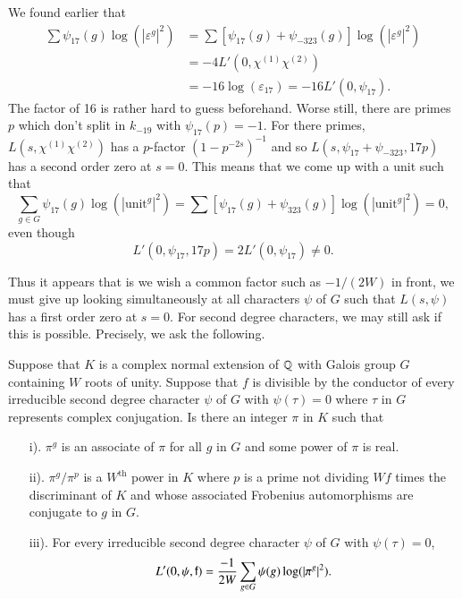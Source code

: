 We found earlier that 
\begin{align*}
\sum \psi_{17} (g) \log (|\varepsilon^g|^2) & =  \sum [\psi_{17}  (g) + \psi_{-323} (g) ]   \log (|\varepsilon^g|^2)\\
& = -4 L' (0, \chi^{(1)} \chi^{(2)})\\
& = -16 \log (\varepsilon_{17}) = -16 L' (0,\psi_{17}).
\end{align*}
The factor of 16 is rather hard to guess beforehand. Worse still, there are primes $p$ which don't split in $k_{-19}$ with $\psi_{17} (p) = -1$. For there primes, $L(s, \chi^{(1)} \chi^{(2)})$ has a $p$-factor $(1-p^{-2s})^{-1}$ and so $L(s, \psi_{17} + \psi_{-323}, 17p)$ has a second order zero at $s =0$. This means that we come up with a unit such that 
$$
\sum\limits_{g \in G} \psi_{17} (g) \log (|\text{unit}^g|^2) = \sum [\psi_{17} (g) + \psi_{323} (g)]   \log (|\text{unit}^g|^2) = 0,
$$
even though
$$
L' (0, \psi_{17}, 17p) = 2 L' (0,\psi_{17}) \neq 0.
$$

Thus it appears that is we wish a common factor such as $-1 /(2W)$ in front, we must give up looking simultaneously at all characters $\psi$ of $G$ such that $L(s, \psi)$ has a first order zero at $s =0$. For second degree characters, we may still ask if this is possible. Precisely, we ask the following.

\begin{question*}
Suppose that $K$ is a complex normal extension of $\mathbb{Q}$ with Galois group $G$ containing $W$ roots of unity. Suppose that $f$ is divisible by the conductor of every irreducible second degree character $\psi$ of $G$ with $\psi(\tau) =0$ where $\tau$ in $G$ represents complex conjugation. Is there an integer $\pi$ in $K$ such that 
\begin{itemize}
\item[i).] $\pi^g$ is an associate of $\pi$ for all $g$ in $G$ and some power of $\pi$ is real. 

\item[ii).] $\pi^g/ \pi^p$ is a $W^{\text{th}}$ power in $K$ where $p$ is a prime not dividing $Wf$ times the discriminant of $K$ and whose associated Frobenius automorphisms are conjugate to $g$ in $G$.

\item[iii).] For every irreducible second degree character $\psi$ of $G$ with $\psi (\tau) = 0$, 
$$
L' (0, \psi, \mathsf{f}) = \frac{-1}{2 W} \sum\limits_{g \in G} \psi (g) \log (|\pi^g|^2).
$$
\end{itemize}
\end{question*}

